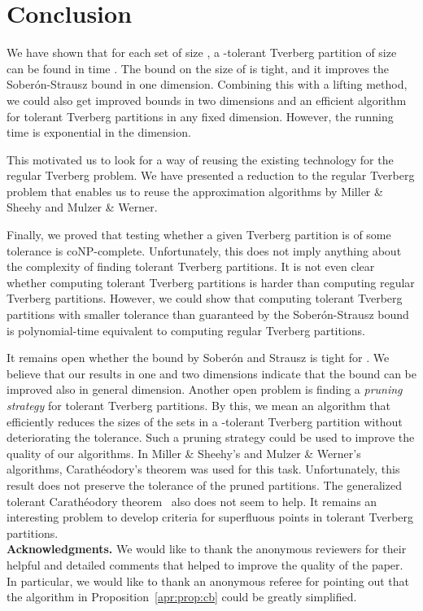 \documentclass[oribibl,envcountsame,envcountsect]{llncs}
\newcommand{\Soberon}{Sober\'{o}n}
\newcommand{\Caratheodory}{Carath\'{e}odory}
\begin{document}
\section{Conclusion}
We have shown that for each set  of size , a
-tolerant Tverberg partition of size  can be found in time
. The bound on the size of  is tight, and it improves
the \Soberon{}-Strausz bound in one dimension.
Combining this with a lifting method, we could also get improved bounds in
two dimensions and an efficient algorithm for tolerant Tverberg partitions in
any fixed dimension.
However, the running time is exponential in the dimension.

This motivated us to look for a way of reusing the existing technology for
the regular Tverberg problem.
We have presented a reduction to the regular Tverberg problem
that enables us to
reuse the approximation algorithms by Miller \& Sheehy and Mulzer \& Werner.

Finally, we proved that testing whether a given Tverberg partition is of
some tolerance  is coNP-complete.
Unfortunately, this does not imply anything about the complexity of
finding tolerant Tverberg partitions. It is not even clear
whether computing tolerant Tverberg partitions is harder than computing
regular Tverberg partitions. However, we could show that computing tolerant
Tverberg partitions with smaller tolerance than guaranteed by the
\Soberon{}-Strausz bound is polynomial-time equivalent to computing regular
Tverberg partitions.

It remains open whether the bound by \Soberon{} and Strausz is tight for .
We believe that our results in one and two dimensions indicate that
the bound can be improved also in general dimension.
Another open problem is finding a \emph{pruning strategy} for tolerant
Tverberg partitions. By this, we mean an
algorithm that efficiently reduces the sizes of the sets in a -tolerant Tverberg
partition without deteriorating the tolerance.
Such a pruning strategy could be used to improve the quality of our algorithms.
In Miller \& Sheehy's and Mulzer \& Werner's algorithms,
\Caratheodory{}'s theorem was used for this task. Unfortunately, this result does not
preserve the tolerance of the pruned partitions. The generalized tolerant
\Caratheodory{} theorem~\cite{Montejano2011} also does not seem to help. It remains an
interesting problem to develop criteria for superfluous points
in tolerant Tverberg partitions.
\\

\noindent\textbf{Acknowledgments.}
We would like to thank the anonymous reviewers for their helpful
and detailed comments that helped to improve the quality of the
paper. In particular, we would like to thank an anonymous referee
for pointing out that the algorithm in
Proposition~\ref{apr:prop:cb} could be greatly simplified.




\end{document}
